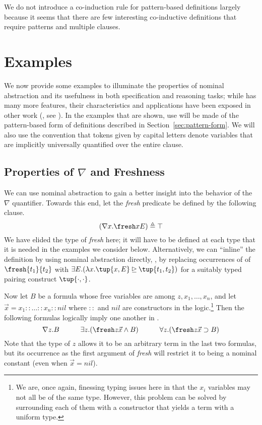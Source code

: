 We do not introduce a co-induction rule for pattern-based
definitions largely because it seems that there are few interesting
co-inductive definitions that require patterns and multiple clauses.


\section{Examples}
\label{sec:examples}

We now provide some examples to illuminate the properties of nominal
abstraction and its usefulness in both specification and reasoning
tasks; while \logic has many more features, their characteristics and
applications have been exposed in other work (\eg, see
\cite{mcdowell02tocl,momigliano03types,tiu04phd,tiu.tocl}). In the
examples that are shown, use will be made of the pattern-based form of
definitions described in Section~\ref{sec:pattern-form}. We will also
use the convention that tokens given by capital letters denote
variables that are implicitly universally quantified over the entire
clause.

\subsection{Properties of $\nabla$ and Freshness}
\label{sec:nabla-freshness}

We can use nominal abstraction to gain a better insight into the
behavior of the $\nabla$ quantifier. Towards this end, let the {\sl fresh}
predicate be defined by the following clause.
\begin{equation*}
(\nabla x.\fresh x E) \triangleq \top
\end{equation*}
We have elided the type of {\sl fresh} here; it will have to be
defined at each type that it is needed in the examples we consider
below. Alternatively, we can ``inline'' the definition by using nominal
abstraction directly, \ie, by replacing occurrences of of $\fresh
{t_1} {t_2}$ with $\exists E. (\lambda x. \tup{x, E} \unrhd \tup{t_1,
  t_2})$ for a suitably typed pairing construct $\tup{\cdot,\cdot}$.

Now let $B$ be a formula whose free variables are among $z, x_1,
\ldots, x_n$, and let $\vec{x} = x_1 :: \ldots :: x_n :: nil$ where
$::$ and $nil$ are constructors in the logic.\footnote{We are, once
  again, finessing typing issues here in that the $x_i$ variables may
  not all be of the same type. However, this problem can be solved by
  surrounding each of them with a constructor that yields a term with
  a uniform type.} Then the following
formulas logically imply one another in \logic.
\[
\nabla z. B \qquad\quad
\exists z. (\fresh z \vec{x} \land B) \qquad\quad
\forall z. (\fresh z \vec{x} \supset B)
\]
Note that the type of $z$ allows it to be an arbitrary term in the
last two formulas, but its occurrence as the first argument of {\sl
  fresh} will restrict it to being a nominal constant (even when
$\vec{x} = nil$).

